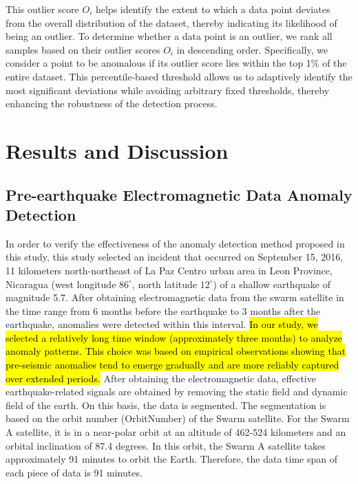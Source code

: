 \documentclass[3p,authoryear,preprint,12pt]{elsarticle}
\begin{document}
This outlier score $O_i$  helps identify the extent to which a data point deviates from the overall distribution of the dataset, thereby indicating its likelihood of being an outlier. {To determine whether a data point is an outlier, we rank all samples based on their outlier scores $O_i$ in descending order. Specifically, we consider a point to be anomalous if its outlier score lies within the top 1\% of the entire dataset. This percentile-based threshold allows us to adaptively identify the most significant deviations while avoiding arbitrary fixed thresholds, thereby enhancing the robustness of the detection process.}   
\section{Results and Discussion}
\subsection{Pre-earthquake Electromagnetic Data Anomaly Detection}
{In order to verify the effectiveness of the anomaly detection method proposed in this study, this study selected an incident that occurred on September 15, 2016, 11 kilometers north-northeast of La Paz Centro urban area in Leon Province, Nicaragua (west longitude $86^\circ$, north latitude $12^\circ$) of a shallow earthquake of magnitude 5.7. After obtaining electromagnetic data from the swarm satellite in the time range from 6 months before the earthquake to 3 months after the earthquake, anomalies were detected within this interval. \hl{In our study, we selected a relatively long time window (approximately three months) to analyze anomaly patterns. This choice was based on empirical observations showing that pre-seismic anomalies tend to emerge gradually and are more reliably captured over extended periods.} After obtaining the electromagnetic data, effective earthquake-related signals are obtained by removing the static field and dynamic field of the earth. On this basis, the data is segmented. The segmentation is based on the orbit number (OrbitNumber) of the Swarm satellite. For the Swarm A satellite, it is in a near-polar orbit at an altitude of 462-524 kilometers and an orbital inclination of 87.4 degrees. In this orbit, the Swarm A satellite takes approximately 91 minutes to orbit the Earth. Therefore, the data time span of each piece of data is 91 minutes.}
\end{document}
